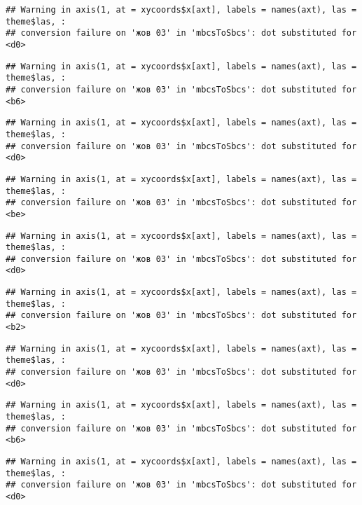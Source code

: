 \documentclass[]{article}
\begin{document}
\begin{verbatim}
## Warning in axis(1, at = xycoords$x[axt], labels = names(axt), las = theme$las, :
## conversion failure on 'жов 03' in 'mbcsToSbcs': dot substituted for <d0>
\end{verbatim}

\begin{verbatim}
## Warning in axis(1, at = xycoords$x[axt], labels = names(axt), las = theme$las, :
## conversion failure on 'жов 03' in 'mbcsToSbcs': dot substituted for <b6>
\end{verbatim}

\begin{verbatim}
## Warning in axis(1, at = xycoords$x[axt], labels = names(axt), las = theme$las, :
## conversion failure on 'жов 03' in 'mbcsToSbcs': dot substituted for <d0>
\end{verbatim}

\begin{verbatim}
## Warning in axis(1, at = xycoords$x[axt], labels = names(axt), las = theme$las, :
## conversion failure on 'жов 03' in 'mbcsToSbcs': dot substituted for <be>
\end{verbatim}

\begin{verbatim}
## Warning in axis(1, at = xycoords$x[axt], labels = names(axt), las = theme$las, :
## conversion failure on 'жов 03' in 'mbcsToSbcs': dot substituted for <d0>
\end{verbatim}

\begin{verbatim}
## Warning in axis(1, at = xycoords$x[axt], labels = names(axt), las = theme$las, :
## conversion failure on 'жов 03' in 'mbcsToSbcs': dot substituted for <b2>
\end{verbatim}

\begin{verbatim}
## Warning in axis(1, at = xycoords$x[axt], labels = names(axt), las = theme$las, :
## conversion failure on 'жов 03' in 'mbcsToSbcs': dot substituted for <d0>
\end{verbatim}

\begin{verbatim}
## Warning in axis(1, at = xycoords$x[axt], labels = names(axt), las = theme$las, :
## conversion failure on 'жов 03' in 'mbcsToSbcs': dot substituted for <b6>
\end{verbatim}

\begin{verbatim}
## Warning in axis(1, at = xycoords$x[axt], labels = names(axt), las = theme$las, :
## conversion failure on 'жов 03' in 'mbcsToSbcs': dot substituted for <d0>
\end{verbatim}
\end{document}
